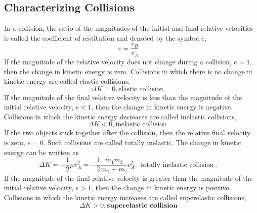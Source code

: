\subsection{ Characterizing Collisions}
In a collision, the ratio of the magnitudes of the initial and final relative velocities is called the coefficient of restitution and denoted by the symbol $e$,
$$
e=\frac{v_{B}}{v_{A}}
$$
If the magnitude of the relative velocity does not change during a collision, $e=1$, then the change in kinetic energy is zero. Collisions in which there is no change in kinetic energy are called elastic collisions,
$$\Delta K=0, \text{elastic collision }$$
If the magnitude of the final relative velocity is less than the magnitude of the initial relative velocity, $e<1$, then the change in kinetic energy is negative. Collisions in which the kinetic energy decreases are called inelastic collisions,
$$\Delta K<0, \text{inelastic collision }$$
If the two objects stick together after the collision, then the relative final velocity is zero, $e=0 .$ Such collisions are called totally inelastic. The change in kinetic energy can be written as\\
$$\Delta K=-\frac{1}{2} \mu v_{A}^{2}=-\frac{1}{2} \frac{m_{1} m_{2}}{m_{1}+m_{2}} v_{A}^{2}, \text { totally inelastic collision } .$$
If the magnitude of the final relative velocity is greater than the magnitude of the initial relative velocity, $e>1$, then the change in kinetic energy is positive. Collisions in which the kinetic energy increases are called superelastic collisions,
$$\Delta K>0, \textbf{superelastic collision}$$
